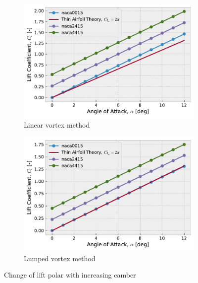 \begin{figure}[h]
  \centering
  \begin{subfigure}{.5\textwidth}
    \centering
    \captionsetup{width=.8\linewidth}
    \includegraphics[width=.9\linewidth]{static/thick_camber_cla.pdf}
    \caption{\centering Linear vortex method}
    \label{fig:cambercl1}
  \end{subfigure}\hfill%
  \begin{subfigure}{.5\textwidth}
    \centering
    \captionsetup{width=.8\linewidth}
    \includegraphics[width=.9\linewidth]{static/thin_camber_cla.pdf}
    \caption{\centering Lumped vortex method}
    \label{fig:cambercl2}
  \end{subfigure}
  \caption{\centering Change of lift polar with increasing camber}
  \label{fig:cambercl}
\end{figure}

